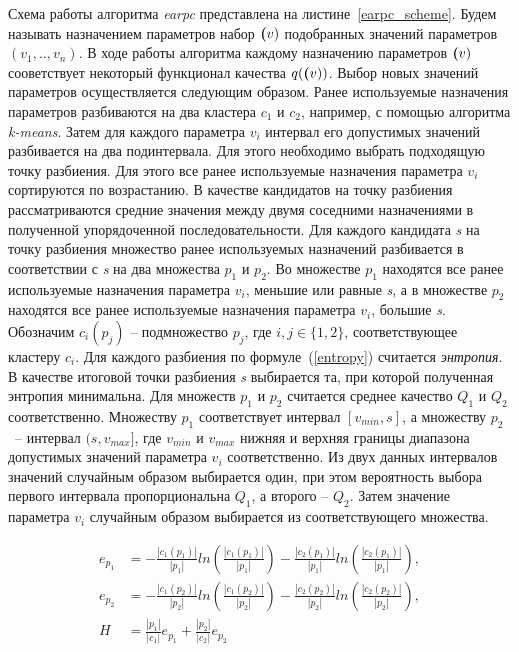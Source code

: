 Схема работы алгоритма \textit{earpc} представлена на листине~\ref{earpc_scheme}. Будем называть назначением параметров набор $\textbf(v)$ подобранных значений параметров $(v_1, .., v_n)$. В ходе работы алгоритма каждому назначению параметров $\textbf(v)$ сооветствует некоторый функционал качества $q(\textbf(v))$. Выбор новых значений параметров осуществляется следующим образом. Ранее используемые назначения параметров разбиваются на два кластера $c_1$ и $c_2$, например, с помощью алгоритма \textit{k-means}. Затем для каждого параметра $v_i$ интервал его допустимых значений разбивается на два подинтервала. Для этого необходимо выбрать подходящую точку разбиения. Для этого все ранее используемые назначения параметра $v_i$ сортируются по возрастанию. В качестве кандидатов на точку разбиения рассматриваются средние значения между двумя соседними назначениями в полученной упорядоченной последовательности. Для каждого кандидата \textit{s} на точку разбиения  множество ранее используемых назначений разбивается в соответствии с \textit{s} на два множества $p_1$ и $p_2$. Во множестве $p_1$ находятся все ранее используемые назначения параметра $v_i$, меньшие или равные \textit{s}, а в множестве $p_2$ находятся все ранее используемые назначения параметра $v_i$, большие \textit{s}. 
Обозначим $c_i(p_j)$ -- подмножество $p_j$, где $i, j \in \{1, 2\}$,  соответствующее кластеру $c_i$. Для каждого разбиения по формуле~(\ref{entropy}) считается \textit{энтропия}. В качестве итоговой точки разбиения \textit{s} выбирается та, при которой полученная энтропия минимальна. Для множеств $p_1$ и $p_2$ считается среднее качество $Q_1$ и $Q_2$ соответственно. Множеству $p_1$ соответствует интервал $[v_{min}, s]$, а множеству $p_2$~-- интервал $(s, v_{max}]$, где $v_{min}$ и $v_{max}$ нижняя и верхняя границы диапазона допустимых значений параметра $v_{i}$ соответственно. Из двух данных интервалов значений случайным образом выбирается один, при этом вероятность выбора первого интервала пропорциональна $Q_1$, а второго -- $Q_2$. Затем значение параметра $v_i$ случайным образом выбирается из соответствующего множества. 

\begin{align}
\label{entropy}
e_{p_1} & = -\frac{|c_1(p_1)|}{|p_1|}ln(\frac{|c_1(p_1)|}{|p_1|}) -\frac{|c_2(p_1)|}{|p_1|}ln(\frac{|c_2(p_1)|}{|p_1|}), \nonumber \\
e_{p_2} & = -\frac{|c_1(p_2)|}{|p_2|}ln(\frac{|c_1(p_2)|}{|p_2|}) -\frac{|c_2(p_2)|}{|p_2|}ln(\frac{|c_2(p_2)|}{|p_2|}), \\
H & = \frac{|p_1|}{|c_1|}e_{p_1} + \frac{|p_2|}{|c_2|}e_{p_2} \nonumber 
\end{align}


